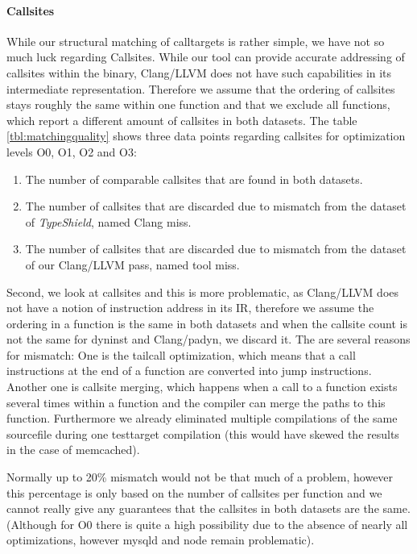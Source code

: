 \paragraph{Callsites} While our structural matching of calltargets is rather simple, we have not so much luck regarding Callsites. While our tool can provide accurate addressing of callsites within the binary, Clang/LLVM does not have such capabilities in its intermediate representation. Therefore we assume that the ordering of callsites stays roughly the same within one function and that we exclude all functions, which report a different amount of callsites in both datasets.
The table \ref{tbl:matchingquality} shows three data points regarding callsites for optimization levels O0, O1, O2 and O3:
\begin{enumerate}
\item The number of comparable callsites that are found in both datasets.
\item The number of callsites that are discarded due to mismatch from the dataset of \textit{TypeShield}, named Clang miss.
\item The number of callsites that are discarded due to mismatch from the dataset of our Clang/LLVM pass, named tool miss.
\end{enumerate}


Second, we look at callsites and this is more problematic, as Clang/LLVM does not have a notion of instruction address in its IR, therefore we assume the ordering in a function is the same in both datasets and when the callsite count is not the same for dyninst and Clang/padyn, we discard it. The are several reasons for mismatch: One is the tailcall optimization, which means that a call instructions at the end of a function are converted into jump instructions. Another one is callsite merging, which happens when a call to a function exists several times within a function and the compiler can merge the paths to this function.
Furthermore we already eliminated multiple compilations of the same sourcefile during one testtarget compilation (this would have skewed the results in the case of memcached).

Normally up to 20\% mismatch would not be that much of a problem, however this percentage is only based on the number of callsites per function and we cannot really give any guarantees that the callsites in both datasets are the same. (Although for O0 there is quite a high possibility due to the absence of nearly all optimizations, however mysqld and node remain problematic).

